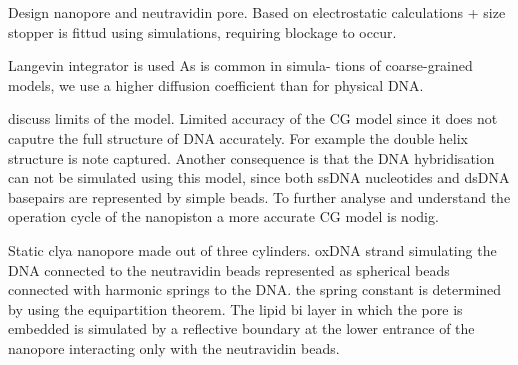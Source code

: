 Design nanopore and neutravidin pore. Based on electrostatic calculations + size stopper
is fittud using simulations, requiring blockage to occur.

Langevin integrator is used As is common in simula- tions of coarse-grained models, we
use a higher diffusion coefficient than for physical DNA.

discuss limits of the model. Limited accuracy of the CG model since it does not caputre
the full structure of DNA accurately. For example the double helix structure is note
captured. Another consequence is that the DNA hybridisation can not be simulated using
this model, since both ssDNA nucleotides and dsDNA basepairs are represented by simple
beads. To further analyse and understand the operation cycle of the nanopiston a more
accurate CG model is nodig.

Static clya nanopore made
out of three cylinders. oxDNA strand simulating the DNA connected to the neutravidin
beads represented as spherical beads connected with harmonic springs to the DNA. the
spring constant is determined by using the equipartition theorem. The lipid bi layer in
which the pore is embedded is simulated by a reflective boundary at the lower entrance of
the nanopore interacting only with the neutravidin beads.
